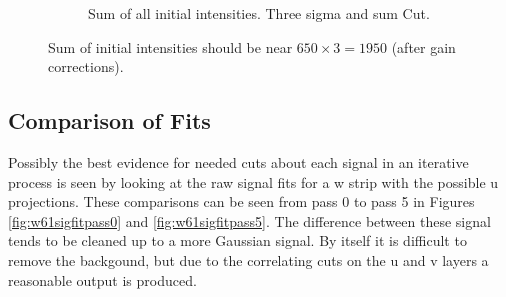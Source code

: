\begin{figure}[h]
\begin{subfigure}[h]{0.3\textwidth}
        \caption{Sum of all initial intensities. Three sigma and sum Cut.}
        \label{fig:allcutsIsum}
    \end{subfigure}
    \caption{Sum of initial intensities should be near $650 \times 3 = 1950$ (after gain corrections).}
    \label{fig:intensities}
\end{figure}

\FloatBarrier
\subsection{Comparison of Fits}
Possibly the best evidence for needed cuts about each signal in an iterative process 
is seen by looking at the raw signal fits for a w strip with the possible u projections. 
These comparisons can be seen from pass 0 to pass 5 in Figures \ref{fig:w61sigfitpass0} and 
\ref{fig:w61sigfitpass5}. The difference between these signal tends to be cleaned up to a 
more Gaussian signal. By itself it is difficult to remove the backgound, but due to the correlating 
cuts on the u and v layers a reasonable output is produced.

